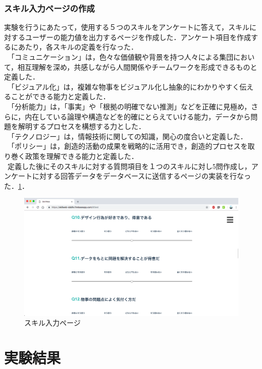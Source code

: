 \documentclass{funthesis}
\begin{document}
\subsubsection{スキル入力ページの作成}
実験を行うにあたって，使用する５つのスキルをアンケートに答えて，スキルに対するユーザーの能力値を出力するページを作成した．アンケート項目を作成するにあたり，各スキルの定義を行なった．\\
\ 「コミュニケーション」は，色々な価値観や背景を持つ人々による集団において，相互理解を深め，共感しながら人間関係やチームワークを形成できるものと定義した．\\
\ 「ビジュアル化」は，複雑な物事をビジュアル化し抽象的にわかりやすく伝えることができる能力と定義した．\\
\ 「分析能力」は，「事実」や「根拠の明確でない推測」などを正確に見極め，さらに，内在している論理や構造などを的確にとらえていける能力，データから問題を解明するプロセスを構想する力とした．\\
\ 「テクノロジー」は，情報技術に関しての知識，関心の度合いと定義した．\\
\ 「ポリシー」は，創造的活動の成果を戦略的に活用でき，創造的プロセスを取り巻く政策を理解できる能力と定義した．\\
\ 定義した後にそのスキルに対する質問項目を１つのスキルに対し5問作成し，アンケートに対する回答データをデータベースに送信するページの実装を行なった．\ref{testtest}．

\begin{figure}[h]
 \centering
   \includegraphics[width=150mm]{figures/test.png}
 \caption{スキル入力ページ}
 \label{testtest}
\end{figure}




\section{実験結果}
\end{document}
